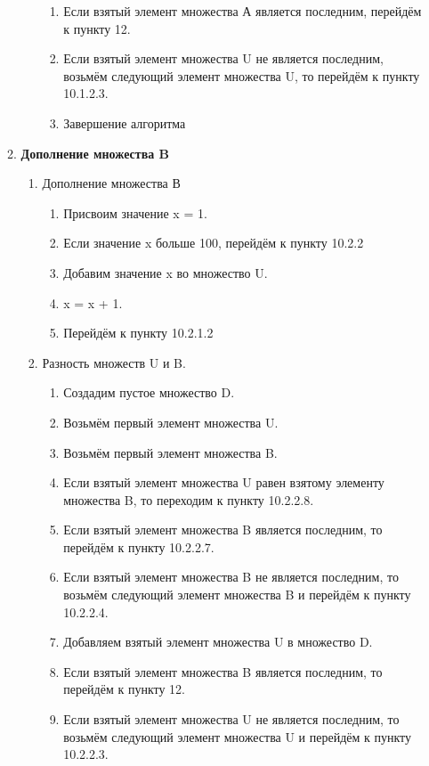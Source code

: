 \documentclass[a4paper,12pt]{extarticle}
\begin{document}
\begin{enumerate}
\begin{enumerate}[label*=\arabic*.]
\begin{enumerate}[label*=\arabic*.]
\begin{enumerate}[label*=\arabic*.]
        \item Если взятый элемент множества А является последним, перейдём к пункту 12.
        \item Если взятый элемент множества U не является последним, возьмём следующий элемент множества U, то перейдём к пункту 10.1.2.3.
        \item Завершение алгоритма
      \end{enumerate}
    \end{enumerate}
    \item \textbf{Дополнение множества B}
    \begin{enumerate}[label*=\arabic*.]
      \item Дополнение множества В
        \begin{enumerate}[label*=\arabic*.]
          \item Присвоим значение x = 1.
          \item Если значение x больше 100, перейдём к пункту 10.2.2
          \item Добавим значение x во множество U.
          \item x = x + 1.
          \item Перейдём к пункту 10.2.1.2
        \end{enumerate}
      \item Разность множеств U и B.
        \begin{enumerate}[label*=\arabic*.]
          \item Создадим пустое множество D.
          \item Возьмём первый элемент множества U.
          \item Возьмём первый элемент множества B.
          \item Если взятый элемент множества U равен взятому элементу множества B, то переходим к пункту 10.2.2.8.
          \item Если взятый элемент множества B является последним, то перейдём к пункту 10.2.2.7.
          \item Если взятый элемент множества B не является последним, то возьмём следующий элемент множества B и перейдём к пункту 10.2.2.4.
          \item Добавляем взятый элемент множества U в множество D.
          \item Если взятый элемент множества B является последним, то перейдём к пункту 12.
          \item Если взятый элемент множества U не является последним, то возьмём следующий элемент множества U и перейдём к пункту 10.2.2.3.

\end{enumerate}
\end{enumerate}
\end{enumerate}
\end{enumerate}
\end{document}
